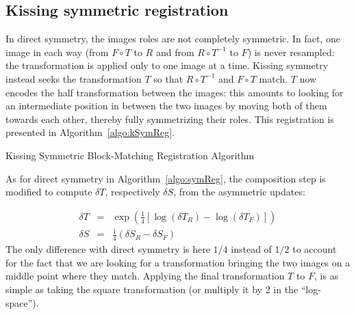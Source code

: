 \documentclass[a4paper]{article}
\begin{document}

\subsection{Kissing symmetric registration} %
\label{sub:kissing_symmetric_registration}

In direct symmetry, the images roles are not completely symmetric. In fact, one image in each way (from $F \circ T$ to $R$ and from $R \circ T^{-1}$ to $F$) is never resampled: the transformation is applied only to one image at a time. Kissing symmetry instead seeks the transformation $T$ so that $R \circ T^{-1}$ and $F \circ T$ match. $T$ now encodes the half transformation between the images: this amounts to looking for an intermediate position in between the two images by moving both of them towards each other, thereby fully symmetrizing their roles. This registration is presented in Algorithm~\ref{algo:kSymReg}.

\begin{algorithm}[!htbp]
\caption{Kissing Symmetric Block-Matching Registration Algorithm}
\label{algo:kSymReg}
\begin{algorithmic}[1]
    \ENDFOR
  \ENDFOR
\end{algorithmic}
\end{algorithm}
As for direct symmetry in Algorithm~\ref{algo:symReg}, the composition step is modified to compute $\delta T$, respectively $\delta S$, from the asymmetric updates:

\begin{eqnarray}
	\delta T & = & \exp\left(\frac{1}{4} \left[\log(\delta T_R) - \log(\delta T_F)\right] \right) \\
	\delta S & = & \frac{1}{4} \left(\delta S_R - \delta S_F\right)
\end{eqnarray}
The only difference with direct symmetry is here $1/4$ instead of $1/2$ to account for the fact that we are looking for a transformation bringing the two images on a middle point where they match. Applying the final transformation $T$ to $F$, is as simple as taking the square transformation (or multiply it by 2 in the ``log-space'').

\newpage 



\end{document}
